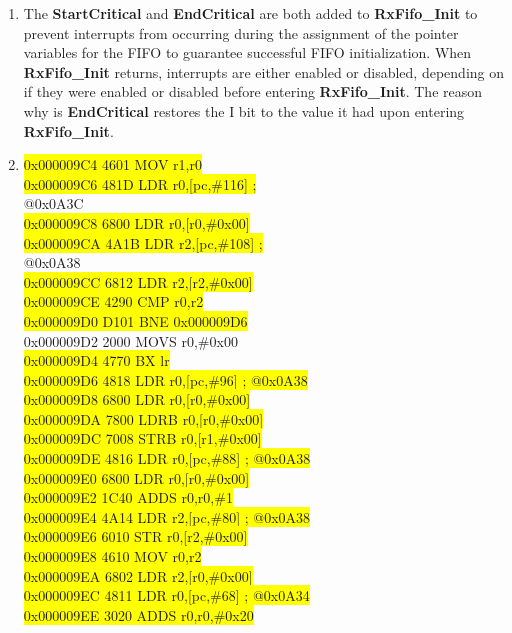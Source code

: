 \documentclass[paper=a4, fontsize=11pt]{scrartcl} %
\numberwithin{equation}{section} %
\numberwithin{figure}{section} %
\numberwithin{table}{section} %
\newcommand{\hl}[1]{\colorbox{yellow}{#1}}
\begin{document}
\begin{enumerate}
\item %
	The \textbf{StartCritical} and \textbf{EndCritical} are both added to \textbf{RxFifo\_Init} to prevent interrupts from occurring during the assignment of the pointer variables for the FIFO to guarantee successful FIFO initialization. When \textbf{RxFifo\_Init} returns, interrupts are either enabled or disabled, depending on if they were enabled or disabled before entering \textbf{RxFifo\_Init}. The reason why is \textbf{EndCritical} restores the I bit to the value it had upon entering \textbf{RxFifo\_Init}.

\item %
		\hl{0x000009C4 4601 MOV r1,r0} \\
		\hl{0x000009C6 481D LDR r0,[pc,\#116] ;} \\
		@0x0A3C \\
		\hl{0x000009C8 6800 LDR r0,[r0,\#0x00]} \\
		\hl{0x000009CA 4A1B LDR r2,[pc,\#108] ;} \\
		@0x0A38 \\
		\hl{0x000009CC 6812 LDR r2,[r2,\#0x00]} \\
		\hl{0x000009CE 4290 CMP r0,r2} \\
		\hl{0x000009D0 D101 BNE 0x000009D6} \\
		0x000009D2 2000 MOVS r0,\#0x00 \\
		\hl{0x000009D4 4770 BX lr} \\
		\hl{0x000009D6 4818 LDR r0,[pc,\#96] ; @0x0A38} \\
		\hl{0x000009D8 6800 LDR r0,[r0,\#0x00]} \\
		\hl{0x000009DA 7800 LDRB r0,[r0,\#0x00]} \\
		\hl{0x000009DC 7008 STRB r0,[r1,\#0x00]} \\
		\hl{0x000009DE 4816 LDR r0,[pc,\#88] ; @0x0A38} \\
		\hl{0x000009E0 6800 LDR r0,[r0,\#0x00]} \\
		\hl{0x000009E2 1C40 ADDS r0,r0,\#1} \\
		\hl{0x000009E4 4A14 LDR r2,[pc,\#80] ; @0x0A38} \\
		\hl{0x000009E6 6010 STR r0,[r2,\#0x00]} \\
		\hl{0x000009E8 4610 MOV r0,r2} \\
		\hl{0x000009EA 6802 LDR r2,[r0,\#0x00]} \\
		\hl{0x000009EC 4811 LDR r0,[pc,\#68] ; @0x0A34} \\
		\hl{0x000009EE 3020 ADDS r0,r0,\#0x20} \\

\end{enumerate}
\end{document}
